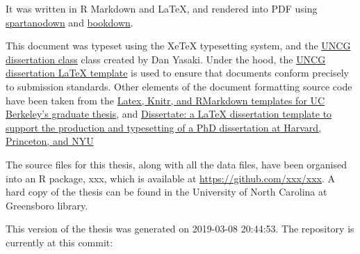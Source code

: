 \documentclass[ms]{uncgdissertationexp}
\theoremstyle{plain}
\theoremstyle{definition}
\theoremstyle{remark}
\begin{document}
  It was written in R Markdown and LaTeX, and rendered into PDF using
  \href{https://github.com/ashley-williams/spartanodown}{spartanodown} and
  \href{https://github.com/rstudio/bookdown}{bookdown}.
  
  This document was typeset using the XeTeX typesetting system, and the
  \href{https://mathstats.uncg.edu/wp-content/uploads/2018/08/uncgdissertationexp.cls}{UNCG
  dissertation class} class created by Dan Yasaki. Under the hood, the
  \href{https://mathstats.uncg.edu/wp-content/uploads/2018/08/sample.tex}{UNCG
  dissertation LaTeX template} is used to ensure that documents conform
  precisely to submission standards. Other elements of the document
  formatting source code have been taken from the
  \href{https://github.com/stevenpollack/ucbthesis}{Latex, Knitr, and
  RMarkdown templates for UC Berkeley's graduate thesis}, and
  \href{https://github.com/suchow/Dissertate}{Dissertate: a LaTeX
  dissertation template to support the production and typesetting of a PhD
  dissertation at Harvard, Princeton, and NYU}
  
  The source files for this thesis, along with all the data files, have
  been organised into an R package, xxx, which is available at
  \url{https://github.com/xxx/xxx}. A hard copy of the thesis can be found
  in the University of North Carolina at Greensboro library.
  
  This version of the thesis was generated on 2019-03-08 20:44:53. The
  repository is currently at this commit:
  
\end{document}
